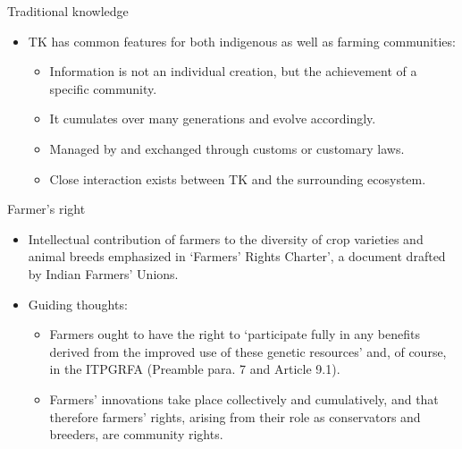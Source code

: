 \documentclass[ignorenonframetext,aspectratio=169]{beamer}
\providecommand{\tightlist}{%
  \setlength{\itemsep}{0pt}\setlength{\parskip}{0pt}}
\begin{document}
\begin{frame}{Traditional knowledge}
\protect\hypertarget{traditional-knowledge-2}{}

\begin{itemize}
\tightlist
\item
  TK has common features for both indigenous as well as farming
  communities:

  \begin{itemize}
  \tightlist
  \item
    Information is not an individual creation, but the achievement of a
    specific community.
  \item
    It cumulates over many generations and evolve accordingly.
  \item
    Managed by and exchanged through customs or customary laws.
  \item
    Close interaction exists between TK and the surrounding ecosystem.
  \end{itemize}
\end{itemize}

\end{frame}

\begin{frame}{Farmer's right}
\protect\hypertarget{farmers-right}{}

\begin{itemize}
\tightlist
\item
  Intellectual contribution of farmers to the diversity of crop
  varieties and animal breeds emphasized in `Farmers' Rights Charter', a
  document drafted by Indian Farmers' Unions.
\item
  Guiding thoughts:

  \begin{itemize}
  \tightlist
  \item
    Farmers ought to have the right to `participate fully in any
    benefits derived from the improved use of these genetic resources'
    and, of course, in the ITPGRFA (Preamble para. 7 and Article 9.1).
  \item
    Farmers' innovations take place collectively and cumulatively, and
    that therefore farmers' rights, arising from their role as
    conservators and breeders, are community rights.
  \end{itemize}
\end{itemize}

\end{frame}
\end{document}
